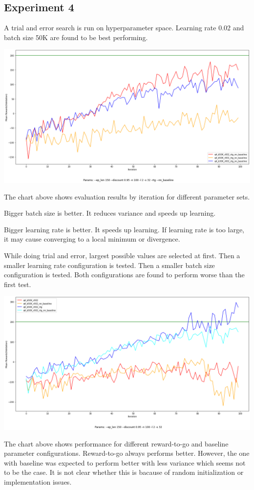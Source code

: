 \documentclass[11pt]{article}
\begin{document}
    \subsection{Experiment 4}

    A trial and error search is run on hyperparameter space.
    Learning rate 0.02 and batch size 50K are found to be best performing.

    \hspace*{-0.75in}
    \includegraphics[scale=0.35]{q4/q4_parameter_comparison}

    The chart above shows evaluation results by iteration for different parameter sets.

    Bigger batch size is better.
    It reduces variance and speeds up learning.

    Bigger learning rate is better.
    It speeds up learning.
    If learning rate is too large, it may cause converging to a local minimum or divergence.

    While doing trial and error, largest possible values are selected at first.
    Then a smaller learning rate configuration is tested.
    Then a smaller batch size configuration is tested.
    Both configurations are found to perform worse than the first test.

    \hspace*{-0.75in}
    \includegraphics[scale=0.35]{q4/q4_rtg_baseline_comparison}

    The chart above shows performance for different reward-to-go and baseline parameter configurations.
    Reward-to-go always performs better.
    However, the one with baseline was expected to perform better with less variance which seems not to be the case.
    It is not clear whether this is bacause of random initialization or implementation issues.
\end{document}
